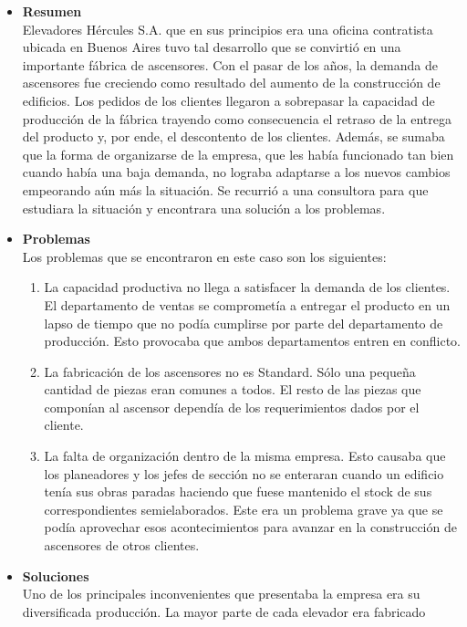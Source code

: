 \documentclass[a4paper,10pt,titlepage]{article}
\begin{document}
\begin{itemize}
 \item \textbf{Resumen}\\
      Elevadores H\'ercules S.A. que en sus principios era una oficina contratista ubicada en Buenos Aires tuvo tal desarrollo que se convirti\'o 
      en una importante f\'abrica de ascensores. Con el pasar de los a\~nos, la demanda de ascensores fue creciendo como resultado del aumento de 
      la construcci\'on de edificios. Los pedidos de los clientes llegaron a sobrepasar la capacidad de producci\'on de la f\'abrica trayendo como 
      consecuencia el retraso de la entrega del producto y, por ende, el descontento de los clientes. Adem\'as, se sumaba que la forma de 
      organizarse de la empresa, que les hab\'ia funcionado tan bien cuando hab\'ia una baja demanda, no lograba adaptarse a los nuevos cambios
      empeorando a\'un m\'as la situaci\'on. Se recurri\'o a una consultora para que estudiara la situaci\'on y encontrara una soluci\'on a los problemas.
 \item \textbf{Problemas}\\
      Los problemas que se encontraron en este caso son los siguientes:
      \begin{enumerate}
	\item La capacidad productiva no llega a satisfacer la demanda de los clientes. El departamento de ventas se compromet\'ia a entregar el 
	producto en un lapso de tiempo que no pod\'ia cumplirse por parte del departamento de producci\'on. Esto provocaba que ambos departamentos
	entren en conflicto.
	\item La fabricaci\'on de los ascensores no es Standard. S\'olo una peque\~na cantidad de piezas eran comunes a todos. El resto de las piezas 
	que compon\'ian al ascensor depend\'ia de los requerimientos dados por el cliente.
	\item La falta de organizaci\'on dentro de la misma empresa. Esto causaba que los planeadores y los jefes de secci\'on no se enteraran cuando 
	un edificio ten\'ia sus obras paradas haciendo que fuese mantenido el stock de sus correspondientes semielaborados. Este era un problema grave 
	ya que se pod\'ia aprovechar esos acontecimientos para avanzar en la construcci\'on de ascensores de otros clientes.
      \end{enumerate}
 \item \textbf{Soluciones}\\
	Uno de los principales inconvenientes que presentaba la empresa era su diversificada producción. La  mayor parte de cada elevador era fabricado 

\end{itemize}
\end{document}
